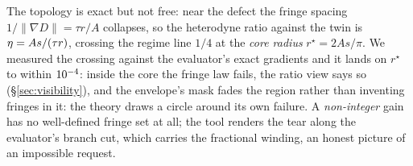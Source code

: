 The topology is exact but not free: near the defect the fringe spacing
$1/\lVert\nabla D\rVert = \tau r/A$ collapses, so the heterodyne ratio
against the twin is $\eta = As/(\tau r)$, crossing the regime line
$1/4$ at the \emph{core radius} $r^\star = 2As/\pi$. We measured the crossing
against the evaluator's exact gradients and it lands on $r^\star$ to within
$10^{-4}$: inside the core the fringe law fails, the ratio view says so
(\S\ref{sec:visibility}), and the envelope's mask fades the region rather
than inventing fringes in it: the theory draws a circle around its own
failure. A \emph{non-integer} gain has no well-defined fringe set at all; the
tool renders the tear along the evaluator's branch cut, which carries the
fractional winding, an honest picture of an impossible request.
